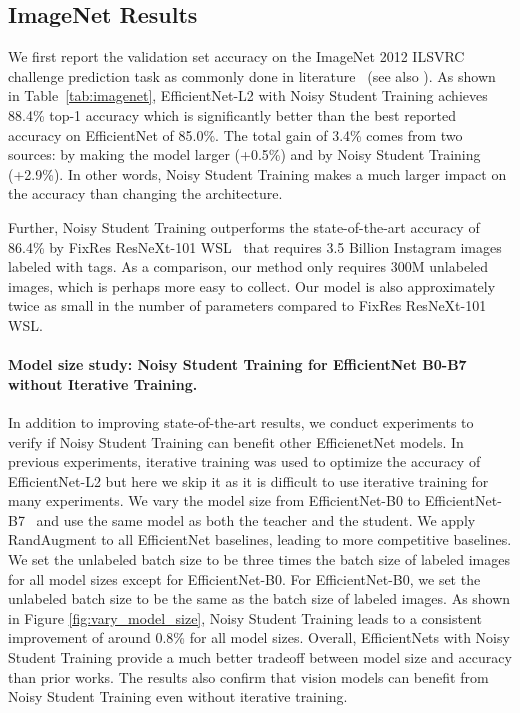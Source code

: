 \documentclass[10pt,twocolumn,letterpaper]{article}
\begin{document}
\subsection{ImageNet Results}
\label{sec:imagenet_results}
We first report the validation set accuracy on the ImageNet  2012 ILSVRC challenge prediction task as commonly done in literature~\cite{krizhevsky2012imagenet,szegedy2015going,he2016deep,tan2019efficientnet} (see also \cite{recht2019imagenet}). As shown in Table~\ref{tab:imagenet}, EfficientNet-L2 with Noisy Student Training achieves 88.4\% top-1 accuracy  which is significantly better than the best reported accuracy on EfficientNet of 85.0\%. The total gain of 3.4\% comes from two sources: by making the model larger (+0.5\%) and by Noisy Student Training (+2.9\%). In other words, Noisy Student Training makes a much larger impact on the accuracy than changing the architecture. 

Further, Noisy  Student Training outperforms the state-of-the-art accuracy of 86.4\% by FixRes ResNeXt-101 WSL~\cite{mahajan2018exploring,touvron2019fixing} that requires 3.5 Billion Instagram images labeled with tags. As a comparison, our method only requires 300M unlabeled images, which is perhaps more easy to collect. Our model is also approximately twice as small in the number of parameters compared to FixRes ResNeXt-101 WSL.


\paragraph{Model size study: Noisy Student Training for EfficientNet B0-B7 without Iterative Training.}  
 In addition to improving state-of-the-art results, we conduct experiments to verify if Noisy Student Training can benefit other EfficienetNet models. In previous experiments, iterative training was used to optimize the accuracy of EfficientNet-L2 but here we skip it as it is difficult to use iterative training for many experiments.
We vary the model size from EfficientNet-B0 to EfficientNet-B7~\cite{tan2019efficientnet} and use the same model as both the teacher and the student. We apply RandAugment to all EfficientNet baselines, leading to more competitive baselines. We set the unlabeled batch size to be three times the batch size of labeled images for all model sizes except for EfficientNet-B0. For EfficientNet-B0, we set the unlabeled batch size to be the same as the batch size of labeled images.
As shown in Figure \ref{fig:vary_model_size}, Noisy Student Training leads to a consistent improvement of around 0.8\% for all model sizes.  Overall, EfficientNets with Noisy Student Training provide a much better tradeoff between model size and accuracy than prior works. The results also confirm that  vision models can benefit from Noisy Student Training even without iterative training.
\end{document}
